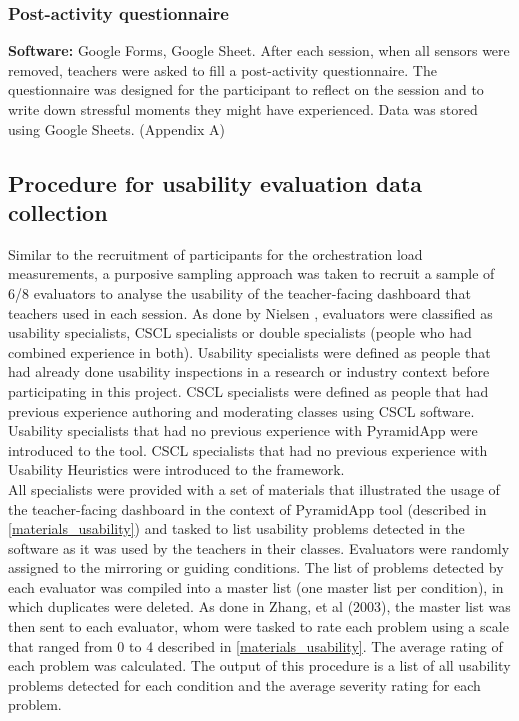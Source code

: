 \subsubsection{Post-activity questionnaire}
\textbf{Software:} Google Forms, Google Sheet.
After each session, when all sensors were removed, teachers were asked to fill a post-activity questionnaire. The questionnaire was designed for the participant to reflect on the session and to write down stressful moments they might have experienced. Data was stored using Google Sheets. (Appendix A)
\subsection{Procedure for usability evaluation data collection}
Similar to the recruitment of participants for the orchestration load measurements, a purposive sampling approach was taken to recruit a sample of 6/8 evaluators to analyse the usability of the teacher-facing dashboard that teachers used in each session. As done by Nielsen \cite{Nielsen1994-un}, evaluators were classified as usability specialists, CSCL specialists or double specialists (people who had combined experience in both). Usability specialists were defined as people that had already done usability inspections in a research or industry context before participating in this project. CSCL specialists were defined as people that had previous experience authoring and moderating classes using CSCL software.\\
Usability specialists that had no previous experience with PyramidApp were introduced to the tool. CSCL specialists that had no previous experience with Usability Heuristics were introduced to the framework.\\
All specialists were provided with a set of materials that illustrated the usage of the teacher-facing dashboard in the context of PyramidApp tool (described in \ref{materials_usability}) and tasked to list usability problems detected in the software as it was used by the teachers in their classes. Evaluators were randomly assigned to the mirroring or guiding conditions. The list of problems detected by each evaluator was compiled into a master list (one master list per condition), in which duplicates were deleted. As done in Zhang, et al (2003)\cite{zhang_johnson_patel_paige_kubose_2003}, the master list was then sent to each evaluator, whom were tasked to rate each problem using a scale that ranged from 0 to 4 described in \ref{materials_usability}. The average rating of each problem was calculated. The output of this procedure is a list of all usability problems detected for each condition and the average severity rating for each problem.
